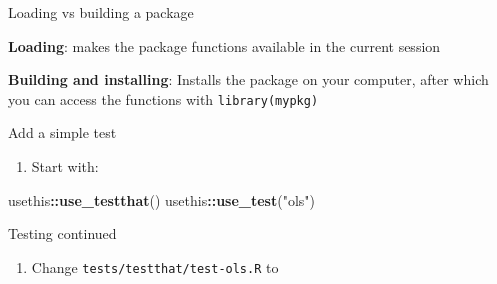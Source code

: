 \documentclass[12pt,ignorenonframetext,compress]{beamer}
\newenvironment{Shaded}{\begin{snugshade}}{\end{snugshade}}
\newcommand{\KeywordTok}[1]{\textcolor[rgb]{0.13,0.29,0.53}{\textbf{#1}}}
\newcommand{\StringTok}[1]{\textcolor[rgb]{0.31,0.60,0.02}{#1}}
\newcommand{\OperatorTok}[1]{\textcolor[rgb]{0.81,0.36,0.00}{\textbf{#1}}}
\newcommand{\NormalTok}[1]{#1}
\providecommand{\tightlist}{%
  \setlength{\itemsep}{0pt}\setlength{\parskip}{0pt}}
\begin{document}
\begin{frame}[fragile]{Loading vs building a package}

\textbf{Loading}: makes the package functions available in the current
session

\textbf{Building and installing}: Installs the package on your computer,
after which you can access the functions with \texttt{library(mypkg)}

\end{frame}

\begin{frame}[fragile]{Add a simple test}

\begin{enumerate}
\def\labelenumi{\arabic{enumi}.}
\tightlist
\item
  Start with:
\end{enumerate}

\begin{Shaded}
\begin{Highlighting}[]
\NormalTok{usethis}\OperatorTok{::}\KeywordTok{use_testthat}\NormalTok{()}
\NormalTok{usethis}\OperatorTok{::}\KeywordTok{use_test}\NormalTok{(}\StringTok{"ols"}\NormalTok{)}
\end{Highlighting}
\end{Shaded}

\end{frame}

\begin{frame}[fragile]{Testing continued}

\begin{enumerate}
\def\labelenumi{\arabic{enumi}.}
\setcounter{enumi}{1}
\tightlist
\item
  Change \texttt{tests/testthat/test-ols.R} to
\end{enumerate}

\begin{Shaded}
\end{Shaded}

\end{frame}
\end{document}

